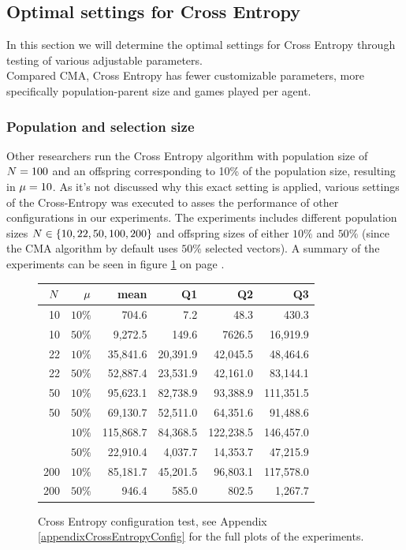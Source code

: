 \subsection{Optimal settings 
for Cross Entropy \label{optimalsettingsce}}

In this section we will determine the optimal settings for Cross Entropy through testing
of various adjustable parameters.\\
Compared CMA, Cross Entropy has fewer customizable parameters, more specifically 
population-parent size and games played per agent.

\subsubsection{Population and selection size}

Other researchers run the Cross Entropy algorithm with population size of
$N = 100$ and an offspring corresponding to 10\% of 
the population size, resulting in $\mu = 10$. As it's not 
discussed why this exact setting is applied, various settings of the 
Cross-Entropy was executed to asses the performance of other configurations
in our experiments.
The experiments includes different population sizes 
$N \in \{10, 22, 50, 100, 200\}$ and offspring 
sizes of either $10\%$ and $50\%$ (since the CMA algorithm by default
uses $50 \%$ selected vectors). 
A summary of the experiments can be seen in figure \ref{CEConfigTest}
on page \pageref{CEConfigTest}.

\begin{figure}[H]
\centering
\begin{tabular}{r r | r r r r}
$N$ & $\mu$ & mean & Q1 & Q2 & Q3\\
\hline
10 & $10\%$  & 704.6      & 7.2       & 48.3         & 430.3\\
10 & $50\%$  & 9,272.5    & 149.6     & 7626.5       & 16,919.9\\
22 & $10\%$  & 35,841.6   & 20,391.9  & 42,045.5     & 48,464.6\\
22 & $50\%$  & 52,887.4   & 23,531.9  & 42,161.0     & 83,144.1\\
50 & $10\%$  & 95,623.1   & 82,738.9  & 93,388.9     & 111,351.5\\
50 & $50\%$  & 69,130.7   & 52,511.0  & 64,351.6     & 91,488.6\\
\hdashline
100 & $10\%$ & 115,868.7  & 84,368.5  & 122,238.5    & 146,457.0\\
\hdashline
100 & $50\%$ & 22,910.4   & 4,037.7   & 14,353.7     & 47,215.9\\
200 & $10\%$ & 85,181.7   & 45,201.5  & 96,803.1     & 117,578.0\\
200 & $50\%$ & 946.4      & 585.0     & 802.5        & 1,267.7
\end{tabular}
\caption{Cross Entropy configuration test, 
see Appendix \ref{appendixCrossEntropyConfig} for the full plots 
of the experiments.  \label{CEConfigTest}}
\end{figure}


